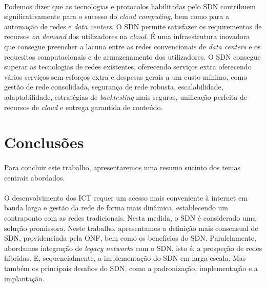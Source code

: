 \documentclass{llncs}
\begin{document}
\paragraph{}
Podemos dizer que as tecnologias e protocolos habilitadas pelo SDN contribuem significativamente para o sucesso do \textit {cloud computing}, bem como para a automação de redes e \textit {data centers}. O SDN permite satisfazer os requirementos de recursos \textit{on demand} dos utilizadores na \textit{cloud}. 
É uma infraestrutura inovadora que consegue preencher a lacuna entre as redes convencionais de \textit{data centers} e os requesitos computacionais e de armazenamento dos utilizadores.
O SDN consegue superar as tecnologias de redes existentes, oferecendo serviços extra oferecendo vários serviços sem esforços extra e despesas gerais a um custo mínimo, como gestão de rede consolidada, segurança de rede robusta, escalabilidade, adaptabilidade, estratégias de \textit {backtesting} mais seguras, unificação perfeita de recursos de \textit{cloud} e entrega garantida de conteúdo.

\section{Conclusões}
\paragraph{}
Para concluir este trabalho, apresentaremos uma resumo sucinto dos temas centrais abordados.
\paragraph{}
O desenvolvimento dos ICT requer um acesso mais conveniente à internet em banda larga e gestão da rede de forma mais dinâmica, establecendo um contraponto com as redes tradicionais. 
Nesta medida, o SDN é considerado uma solução promissora. Neste trabalho, apresentamos a definição mais consensual de SDN, providenciada pela ONF, bem como os benefícios do SDN. 
Paralelamente, abordamos integração de \textit{legacy networks} com o SDN, isto é, a prospeção de redes híbridas. 
E, sequencialmente, a implementação do SDN em larga escala.
Mas também os principais desafios do SDN, como a padronização, implementação e a implantação.

\printbibliography
\end{document}
